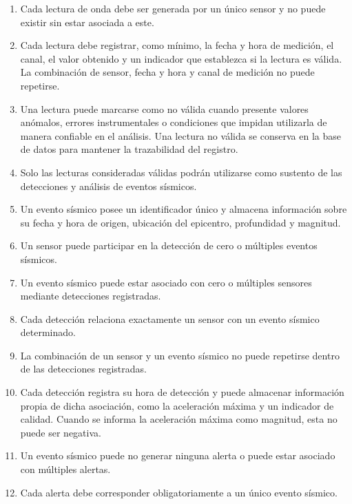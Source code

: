 \documentclass[12pt,a4paper]{article}
\begin{document}
\begin{enumerate}
    \item Cada lectura de onda debe ser generada por un único sensor y no puede existir sin estar asociada a este.

    \item Cada lectura debe registrar, como mínimo, la fecha y hora de medición, el canal, el valor obtenido y un indicador que establezca si la lectura es válida. La combinación de sensor, fecha y hora y canal de medición no puede repetirse.

    \item Una lectura puede marcarse como no válida cuando presente valores anómalos, errores instrumentales o condiciones que impidan utilizarla de manera confiable en el análisis. Una lectura no válida se conserva en la base de datos para mantener la trazabilidad del registro.

    \item Solo las lecturas consideradas válidas podrán utilizarse como sustento de las detecciones y análisis de eventos sísmicos.

    \item Un evento sísmico posee un identificador único y almacena información sobre su fecha y hora de origen, ubicación del epicentro, profundidad y magnitud.

    \item Un sensor puede participar en la detección de cero o múltiples eventos sísmicos.

    \item Un evento sísmico puede estar asociado con cero o múltiples sensores mediante detecciones registradas.

    \item Cada detección relaciona exactamente un sensor con un evento sísmico determinado.

    \item La combinación de un sensor y un evento sísmico no puede repetirse dentro de las detecciones registradas.

    \item Cada detección registra su hora de detección y puede almacenar información propia de dicha asociación, como la aceleración máxima y un indicador de calidad. Cuando se informa la aceleración máxima como magnitud, esta no puede ser negativa.

    \item Un evento sísmico puede no generar ninguna alerta o puede estar asociado con múltiples alertas.

    \item Cada alerta debe corresponder obligatoriamente a un único evento sísmico.


\end{enumerate}
\end{document}

